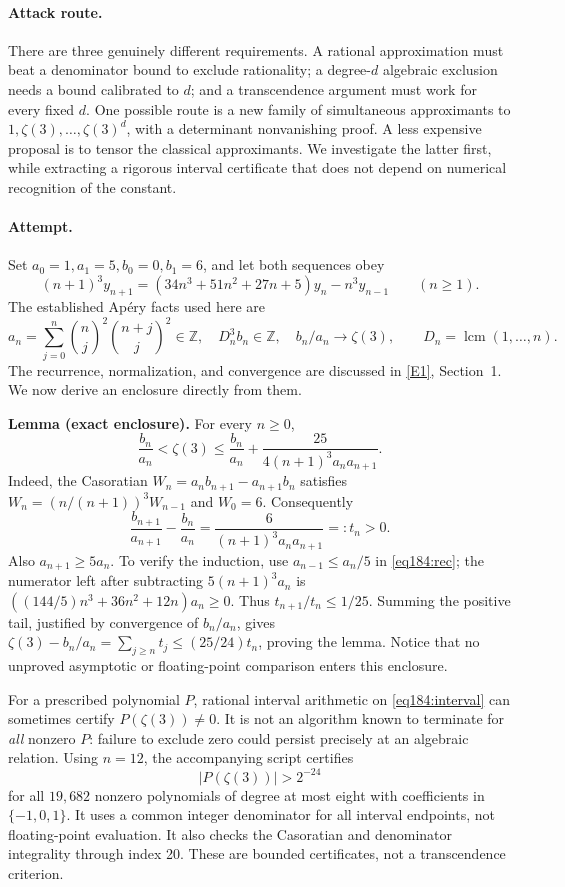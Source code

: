 \documentclass[11pt,a4paper]{article}
\newcommand{\Z}{\mathbb{Z}}
\newcommand{\eref}[2]{\hyperlink{extra:#1:#2}{[E#2]}}
\numberwithin{equation}{section}
\begin{document}
\paragraph{Attack route.}
There are three genuinely different requirements. A rational approximation must beat a denominator bound to exclude rationality; a degree-$d$ algebraic exclusion needs a bound calibrated to $d$; and a transcendence argument must work for every fixed $d$. One possible route is a new family of simultaneous approximants to $1,\zeta(3),\ldots,\zeta(3)^d$, with a determinant nonvanishing proof. A less expensive proposal is to tensor the classical approximants. We investigate the latter first, while extracting a rigorous interval certificate that does not depend on numerical recognition of the constant.

\paragraph{Attempt.}
Set $a_0=1,a_1=5,b_0=0,b_1=6$, and let both sequences obey
\begin{equation}\label{eq184:rec}
(n+1)^3y_{n+1}=(34n^3+51n^2+27n+5)y_n-n^3y_{n-1}\qquad(n\ge1).
\end{equation}
The established Ap\'ery facts used here are
\[
 a_n=\sum_{j=0}^n\binom nj^2\binom{n+j}j^2\in\Z,
 \quad D_n^3b_n\in\Z,\quad b_n/a_n\longrightarrow\zeta(3),
 \qquad D_n=\operatorname{lcm}(1,\ldots,n).
\]
The recurrence, normalization, and convergence are discussed in \eref{statement}{1}, Section~1. We now derive an enclosure directly from them.

\textbf{Lemma (exact enclosure).} For every $n\ge0$,
\begin{equation}\label{eq184:interval}
\frac{b_n}{a_n}<\zeta(3)
 \le \frac{b_n}{a_n}+\frac{25}{4(n+1)^3a_na_{n+1}}.
\end{equation}
Indeed, the Casoratian $W_n=a_nb_{n+1}-a_{n+1}b_n$ satisfies
$W_n=(n/(n+1))^3W_{n-1}$ and $W_0=6$. Consequently
\[
 \frac{b_{n+1}}{a_{n+1}}-\frac{b_n}{a_n}
 =\frac{6}{(n+1)^3a_na_{n+1}}=:t_n>0.
\]
Also $a_{n+1}\ge5a_n$. To verify the induction, use
$a_{n-1}\le a_n/5$ in \eqref{eq184:rec}; the numerator left after subtracting $5(n+1)^3a_n$ is
$((144/5)n^3+36n^2+12n)a_n\ge0$.
Thus $t_{n+1}/t_n\le1/25$. Summing the positive tail, justified by convergence of $b_n/a_n$, gives
$\zeta(3)-b_n/a_n=\sum_{j\ge n}t_j\le(25/24)t_n$, proving the lemma. Notice that no unproved asymptotic or floating-point comparison enters this enclosure.

For a prescribed polynomial $P$, rational interval arithmetic on \eqref{eq184:interval} can sometimes certify $P(\zeta(3))\ne0$. It is not an algorithm known to terminate for \emph{all} nonzero $P$: failure to exclude zero could persist precisely at an algebraic relation. Using $n=12$, the accompanying script certifies
\[
 |P(\zeta(3))|>2^{-24}
\]
for all $19{,}682$ nonzero polynomials of degree at most eight with
coefficients in $\{-1,0,1\}$. It uses a common integer denominator for
all interval endpoints, not floating-point evaluation. It also checks
the Casoratian and denominator integrality through index 20. These
are bounded certificates, not a transcendence criterion.
\end{document}
